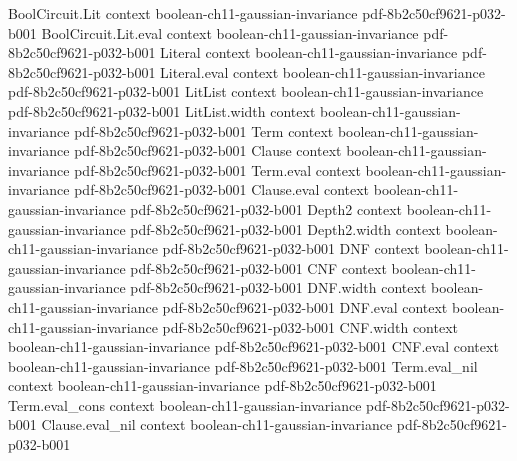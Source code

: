 \begin{theorem}
\label{BooleanAnalysis.GaussianSpace.gaussian_logSobolev}
\leanok
{}
\proofstep
  {BoolCircuit.Lit}
  {context}
  {boolean-ch11-gaussian-invariance}
  {pdf-8b2c50cf9621-p032-b001}
\proofstep
  {BoolCircuit.Lit.eval}
  {context}
  {boolean-ch11-gaussian-invariance}
  {pdf-8b2c50cf9621-p032-b001}
\proofstep
  {Literal}
  {context}
  {boolean-ch11-gaussian-invariance}
  {pdf-8b2c50cf9621-p032-b001}
\proofstep
  {Literal.eval}
  {context}
  {boolean-ch11-gaussian-invariance}
  {pdf-8b2c50cf9621-p032-b001}
\proofstep
  {LitList}
  {context}
  {boolean-ch11-gaussian-invariance}
  {pdf-8b2c50cf9621-p032-b001}
\proofstep
  {LitList.width}
  {context}
  {boolean-ch11-gaussian-invariance}
  {pdf-8b2c50cf9621-p032-b001}
\proofstep
  {Term}
  {context}
  {boolean-ch11-gaussian-invariance}
  {pdf-8b2c50cf9621-p032-b001}
\proofstep
  {Clause}
  {context}
  {boolean-ch11-gaussian-invariance}
  {pdf-8b2c50cf9621-p032-b001}
\proofstep
  {Term.eval}
  {context}
  {boolean-ch11-gaussian-invariance}
  {pdf-8b2c50cf9621-p032-b001}
\proofstep
  {Clause.eval}
  {context}
  {boolean-ch11-gaussian-invariance}
  {pdf-8b2c50cf9621-p032-b001}
\proofstep
  {Depth2}
  {context}
  {boolean-ch11-gaussian-invariance}
  {pdf-8b2c50cf9621-p032-b001}
\proofstep
  {Depth2.width}
  {context}
  {boolean-ch11-gaussian-invariance}
  {pdf-8b2c50cf9621-p032-b001}
\proofstep
  {DNF}
  {context}
  {boolean-ch11-gaussian-invariance}
  {pdf-8b2c50cf9621-p032-b001}
\proofstep
  {CNF}
  {context}
  {boolean-ch11-gaussian-invariance}
  {pdf-8b2c50cf9621-p032-b001}
\proofstep
  {DNF.width}
  {context}
  {boolean-ch11-gaussian-invariance}
  {pdf-8b2c50cf9621-p032-b001}
\proofstep
  {DNF.eval}
  {context}
  {boolean-ch11-gaussian-invariance}
  {pdf-8b2c50cf9621-p032-b001}
\proofstep
  {CNF.width}
  {context}
  {boolean-ch11-gaussian-invariance}
  {pdf-8b2c50cf9621-p032-b001}
\proofstep
  {CNF.eval}
  {context}
  {boolean-ch11-gaussian-invariance}
  {pdf-8b2c50cf9621-p032-b001}
\proofstep
  {Term.eval_nil}
  {context}
  {boolean-ch11-gaussian-invariance}
  {pdf-8b2c50cf9621-p032-b001}
\proofstep
  {Term.eval_cons}
  {context}
  {boolean-ch11-gaussian-invariance}
  {pdf-8b2c50cf9621-p032-b001}
\proofstep
  {Clause.eval_nil}
  {context}
  {boolean-ch11-gaussian-invariance}
  {pdf-8b2c50cf9621-p032-b001}

\end{theorem}
